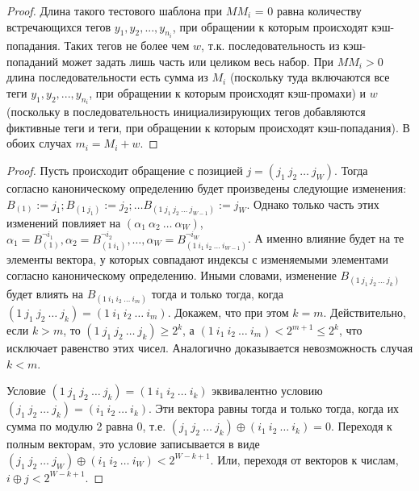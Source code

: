 \begin{proof}
  Длина такого тестового шаблона при $MM_i$ = 0 равна количеству
  встречающихся тегов $y_1, y_2, ..., y_{n_i}$, при обращении к
  которым происходят кэш-попадания. Таких тегов не более чем $w$,
  т.к. последовательность из кэш-попаданий может задать лишь часть
  или целиком весь набор. При $MM_i > 0$ длина последовательности
  есть сумма из $M_i$ (поскольку туда включаются все теги $y_1, y_2,
  ..., y_{n_i}$, при обращении к которым происходят кэш-промахи) и
  $w$ (поскольку в последовательность инициализирующих тегов
  добавляются фиктивные теги и теги, при обращении к которым
  происходят кэш-попадания). В обоих случах $m_i = M_i + w$.
\end{proof}

\theoremtext{\ref{thm_pseudoLRU_invariant}}{\PseudoLRUInvariant}
\begin{proof}
  Пусть происходит обращение с позицией $j = (j_1~j_2~\dots~j_W)$.
  Тогда согласно каноническому определению \PseudoLRU будет
  произведены следующие изменения: $B_{(1)} := j_1; B_{(1~j_1)} :=
  j_2; \dots B_{(1~j_1~j_2~\dots~j_{W-1})} := j_W$. Однако только
  часть этих изменений повлияет на
  $(\alpha_1~\alpha_2~\dots~\alpha_W)$, $\alpha_1 = B_{(1)}^{\neg
  i_1}, \alpha_2 = B_{(1~i_1)}^{\neg i_2}, \dots, \alpha_W =
  B_{(1~i_1~i_2~\dots~i_{W-1})}^{\neg i_W}$. А именно влияние будет
  на те элементы вектора, у которых совпадают индексы с изменяемыми
  элементами согласно каноническому определению. Иными словами,
  изменение $B_{(1~j_1~j_2~\dots~j_k)}$ будет влиять на
  $B_{(1~i_1~i_2~\dots~i_m)}$ тогда и только тогда, когда
  $(1~j_1~j_2~\dots~j_k) = (1~i_1~i_2~\dots~i_m)$. Докажем, что при
  этом $k = m$. Действительно, если $k > m$, то
  $(1~j_1~j_2~\dots~j_k) \geqslant 2^k$, а $(1~i_1~i_2~\dots~i_m) <
  2^{m+1} \leqslant 2^k$, что исключает равенство этих чисел.
  Аналогично доказывается невозможность случая $k < m$.

  Условие $(1~j_1~j_2~\dots~j_k) = (1~i_1~i_2~\dots~i_k)$
  эквивалентно условию $(j_1~j_2~\dots~j_k) = (i_1~i_2~\dots~i_k)$.
  Эти вектора равны тогда и только тогда, когда их сумма по модулю 2
  равна 0, т.е. $(j_1~j_2~\dots~j_k) \oplus (i_1~i_2~\dots~i_k) =
  0$. Переходя к полным векторам, это условие записывается в виде $(j_1~j_2~\dots~j_W) \oplus
  (i_1~i_2~\dots~i_W) < 2^{W-k+1}$. Или, переходя от векторов к
  числам, $i \oplus j < 2^{W-k+1}$.


\end{proof}
